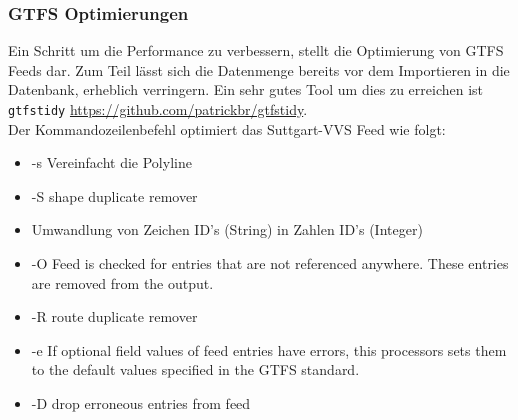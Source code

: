 \subsubsection{GTFS Optimierungen}
\label{ssub:gtfs_optimierungen}
  
  Ein Schritt um die Performance zu verbessern, stellt die Optimierung von GTFS Feeds dar. Zum Teil lässt sich die Datenmenge bereits vor dem Importieren in die Datenbank, erheblich verringern. Ein sehr gutes Tool um dies zu erreichen ist \texttt{gtfstidy} \url{https://github.com/patrickbr/gtfstidy}.\\

  Der Kommandozeilenbefehl \colorbox{materialGrey}{\texttt{\color{white}{\$ gtfstidy -sSiRDeO input.zip output}}} optimiert das Suttgart-VVS Feed wie folgt:

  \begin{itemize}
    \item -s Vereinfacht die Polyline %
    
    \item -S shape duplicate remover

    \item Umwandlung von Zeichen ID's (String) in Zahlen ID's (Integer) %

    \item -O Feed is checked for entries that are not referenced anywhere. These entries are removed from the output.

    \item -R route duplicate remover

    \item -e If optional field values of feed entries have errors, this processors sets them to the default values specified in the GTFS standard.

    \item -D drop erroneous entries from feed

  \end{itemize}

